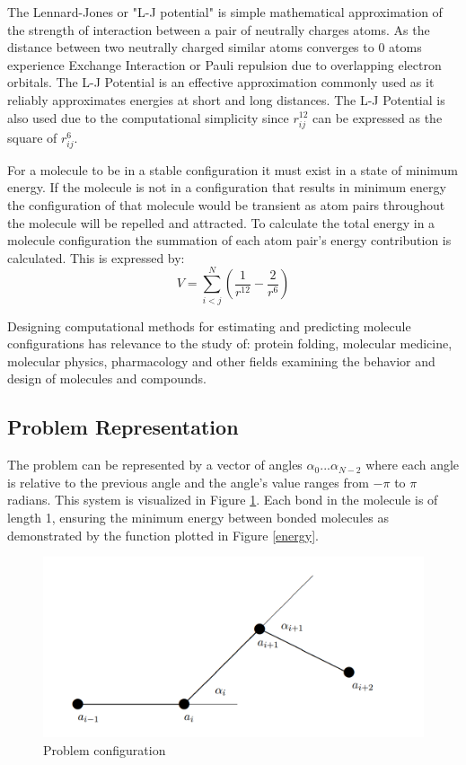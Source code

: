 \documentclass[conference,letterpaper]{IEEEtran}
\begin{document}
\par The Lennard-Jones or "L-J potential" is simple mathematical approximation of the strength of interaction between a pair of neutrally charges atoms. As the distance between two neutrally charged similar atoms converges to 0 atoms experience Exchange Interaction or Pauli repulsion due to overlapping electron orbitals. The L-J Potential is an effective approximation commonly used as it reliably approximates energies at short and long distances. The L-J Potential is also used due to the computational simplicity since $r_{ij}^{12}$ can be expressed as the square of $r_{ij}^6$.


\par For a molecule to be in a stable configuration it must exist in a state of minimum energy. If the molecule is not in a configuration that results in minimum energy the configuration of that molecule would be transient  as atom pairs throughout the molecule will be repelled and attracted. To calculate the total energy in a molecule configuration the summation of each atom pair's energy contribution is calculated. This is expressed by:
\begin{equation}
    V = \sum_{i < j}^{N}(\frac{1}{r^{12}} - \frac{2}{r^{6}})
\end{equation}

Designing computational methods for estimating and predicting molecule configurations has relevance to the study of: protein folding, molecular medicine, molecular physics, pharmacology and other fields examining the behavior and design of molecules and compounds.

\subsection{Problem Representation}
\par
The problem can be represented by a vector of angles $\alpha_{0} ... \alpha_{N-2}$ where each angle is relative to the previous angle and the angle's value ranges from $-\pi$ to $\pi$ radians. This system is visualized in Figure \ref{atom configuration}. Each bond in the molecule is of length 1, ensuring the minimum energy between bonded molecules as demonstrated by the function plotted in Figure \ref{energy}.

\begin{figure}[h]
    \includegraphics[scale=0.3]{configuration}
    \caption{Problem configuration}
    \label{atom configuration}
\end{figure}
\end{document}
